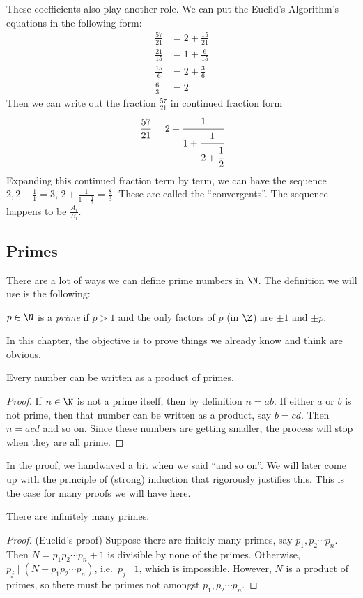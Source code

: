 \documentclass[a4paper]{article}
\begin{document}
These coefficients also play another role. We can put the Euclid's Algorithm's equations in the following form:
\begin{align*}
  \frac{57}{21} &= 2 + \frac{15}{21}\\
  \frac{21}{15} &= 1 + \frac{6}{15}\\
  \frac{15}{6} &= 2 + \frac{3}{6}\\
  \frac{6}{3} &= 2
\end{align*}
Then we can write out the fraction $\frac{57}{21}$ in continued fraction form
\[
  \frac{57}{21} = 2 + \cfrac{1}{1 + \cfrac{1}{2 + \cfrac{1}{2}}}
\]
Expanding this continued fraction term by term, we can have the sequence $2, 2 + \frac{1}{1} = 3$, $2 + \frac{1}{1 + \frac{1}{2}} = \frac{8}{3}$. These are called the ``convergents''. The sequence happens to be $\frac{A_i}{B_i}$.

\subsection{Primes}
There are a lot of ways we can define prime numbers in $\N$. The definition we will use is the following:
\begin{defi}
  $p\in \N$ is a \emph{prime} if $p > 1$ and the only factors of $p$ (in $\Z$) are $\pm 1$ and $\pm p$.
\end{defi}
In this chapter, the objective is to prove things we already know and think are obvious.
\begin{thm}
  Every number can be written as a product of primes.
\end{thm}

\begin{proof}
  If $n\in \N$ is not a prime itself, then by definition $n = ab$. If either $a$ or $b$ is not prime, then that number can be written as a product, say $b = cd$. Then $n = acd$ and so on. Since these numbers are getting smaller, the process will stop when they are all prime.
\end{proof}
In the proof, we handwaved a bit when we said ``and so on''. We will later come up with the principle of (strong) induction that rigorously justifies this. This is the case for many proofs we will have here.

\begin{thm}
  There are infinitely many primes.
\end{thm}

\begin{proof}
  (Euclid's proof) Suppose there are finitely many primes, say $p_1, p_2 \cdots p_n$. Then $N = p_1p_2\cdots p_n + 1$ is divisible by none of the primes. Otherwise, $p_j\mid (N - p_1p_2\cdots p_n)$, i.e.\ $p_j\mid 1$, which is impossible. However, $N$ is a product of primes, so there must be primes not amongst $p_1, p_2\cdots p_n$.
\end{proof}
\end{document}
